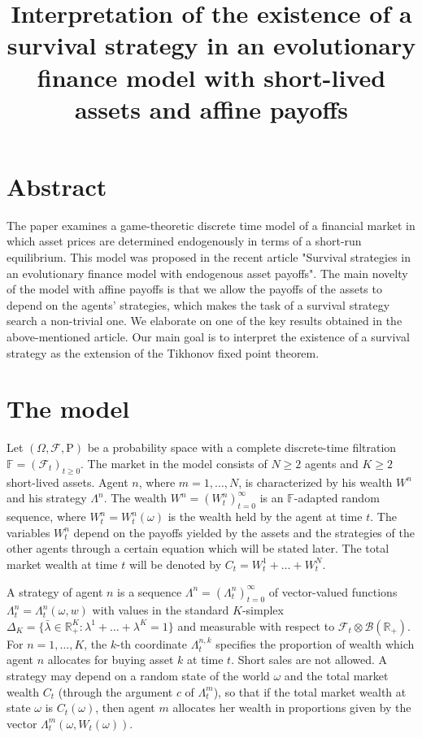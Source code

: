 \documentclass[a4paper,11pt,english]{article}
\title{Interpretation of the existence of a survival strategy in an evolutionary finance model with short-lived assets and affine payoffs}
\author{}
\date{}
\theoremstyle{definition}
\renewcommand{\P}{\mathrm{P}}
\newcommand{\F}{\mathcal{F}}
\newcommand{\R}{\mathbb{R}}
\begin{document}
\maketitle

\section{Abstract}
The paper examines a game-theoretic discrete time model of a financial market 
in which asset prices are determined endogenously in terms of a short-run equilibrium. 
This model was proposed in the recent article "Survival strategies in an evolutionary finance 
model with endogenous asset payoffs". The main novelty of the model with affine payoffs 
is that we allow the payoffs of the assets to depend on the agents' strategies, 
which makes the task of a survival strategy search a non-trivial one. 
We elaborate on one of the key results obtained in the above-mentioned article. 
Our main goal is to interpret the existence of a survival strategy as 
the extension of the Tikhonov fixed point theorem.

\section{The model}

Let $(\Omega,\F,\P)$ be a probability space with a complete discrete-time
 filtration $\mathbb{F} = (\F_t)_{t\ge 0}$.
The market in the model consists of $N\ge 2$ agents and $K\ge 2$ short-lived assets. Agent
$n$, where $m=1,\ldots,N$, is  characterized by his wealth $W^n$ and his
strategy $\Lambda^n$. The wealth $W^n = (W_t^n)_{t=0}^\infty$ is an
$\mathbb{F}$-adapted random sequence, where $W_t^n=W_t^n(\omega)$ is the wealth
held by the agent at time $t$. The variables $W_t^n$  depend on the payoffs yielded by the assets and the strategies of the other agents through a certain equation which will be
stated later. The total market wealth at time $t$ will be denoted by $C_t =
W_t^1+\ldots+W_t^N$. 

A strategy of agent $n$ is a sequence $\Lambda^n =
(\Lambda_t^n)_{t=0}^\infty$ of vector-valued functions $\Lambda_t^n =
\Lambda_t^n(\omega,w)$ with values in the standard $K$-simplex $\Delta_K
=\{\bar \lambda \in \R^K_+ : \lambda^1+\ldots+\lambda^K = 1\}$ and measurable with
respect to $\F_t\otimes \mathcal{B}(\R_+)$. For $n=1,\ldots,K$, the $k$-th
coordinate $\Lambda_t^{n,k}$ specifies the proportion of wealth which agent
$n$ allocates for buying asset $k$ at time $t$. Short sales are not allowed.
A strategy may depend on a random state of the world $\omega$ and the total
market wealth $C_t$ (through the argument $c$ of $\Lambda_t^m$), so that if
the total market wealth at state $\omega$ is $C_t(\omega)$, then agent $m$
allocates her wealth in proportions given by the vector $\Lambda_t^m(\omega,
W_t(\omega))$.
\end{document}
